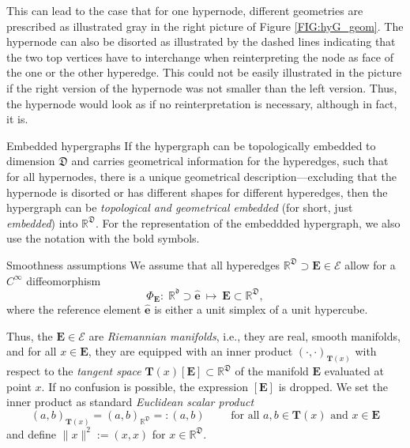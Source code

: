 \documentclass[a4paper, english, 12pt, reqno, draft]{amsart}
\makeatletter
\theoremstyle{definition}
\theoremstyle{remark}
\numberwithin{equation}{section}
\newcommand{\setEdge}{\ensuremath{\mathcal E}}
\newcommand{\SetEdge}{\ensuremath{\boldsymbol{\mathcal E}}}
\newcommand{\Edge}{{\ensuremath{\boldsymbol E}}}
\newcommand{\RefEdge}{{\ensuremath{\widehat{\boldsymbol e}}}}
\newcommand{\locDim}{\ensuremath{\mathfrak d}}
\newcommand{\globDim}{\ensuremath{\mathfrak D}}
\newcommand{\tangent}{\ensuremath{{\boldsymbol T}}}
\newcommand{\diffeo}{\ensuremath{\Phi}}
\newcommand{\IR}{\ensuremath{\mathbb R}}
\def\paragraph{\@startsection{paragraph}{4}%
  \z@\z@{-\fontdimen2\font}%
  {\normalfont\scshape}}
\makeatother
\begin{document}
This can lead to the case that for one hypernode, different geometries are prescribed as illustrated gray in the right picture of Figure \ref{FIG:hyG_geom}. The hypernode can also be disorted as illustrated by the dashed lines indicating that the two top vertices have to interchange when reinterpreting the node as face of the one or the other hyperedge. This could not be easily illustrated in the picture if the right version of the hypernode was not smaller than the left version. Thus, the hypernode would look as if no reinterpretation is necessary, although in fact, it is.

\paragraph{Embedded hypergraphs}
% 
If the hypergraph can be topologically embedded to dimension $\globDim$ and carries geometrical information for the hyperedges, such that for all hypernodes, there is a unique geometrical description---excluding that the hypernode is disorted or has different shapes for different hyperedges, then the hypergraph can be \emph{topological and geometrical embedded} (for short, just \emph{embedded}) into $\IR^\globDim$. For the representation of the embeddded hypergraph, we also use the notation with the bold symbols.

\paragraph{Smoothness assumptions}
% 
We assume that all hyperedges $\IR^\globDim \supset \Edge \in \SetEdge$ allow for a $C^\infty$ diffeomorphism
% 
\begin{equation*}
 \diffeo_\Edge \colon \; \IR^\locDim \supset \RefEdge ~\mapsto~ \Edge \subset \IR^\globDim,
\end{equation*}
% 
where the reference element $\RefEdge$ is either a unit simplex of a unit hypercube.

Thus, the $\Edge\in \setEdge$ are \emph{Riemannian manifolds}, i.e., they are real, smooth manifolds, and for all $x \in \Edge$, they are equipped with an inner product $(\cdot,\cdot)_{\tangent(x)}$ with respect to the \emph{tangent space} $\tangent(x)[\Edge] \subset \IR^\globDim$ of the manifold $\Edge$ evaluated at point $x$. If no confusion is possible, the expression $[\Edge]$ is dropped. We set the inner product as standard \emph{Euclidean scalar product}
% 
\begin{equation*}
 (a,b)_{\tangent(x)} = (a,b)_{\IR^\globDim} =: (a,b) \qquad \text{ for all } a,b \in \tangent(x) \text{ and } x \in \Edge
\end{equation*}
% 
and define $\| x \|^2 := (x,x)$ for $x \in \IR^\globDim$.
\end{document}

